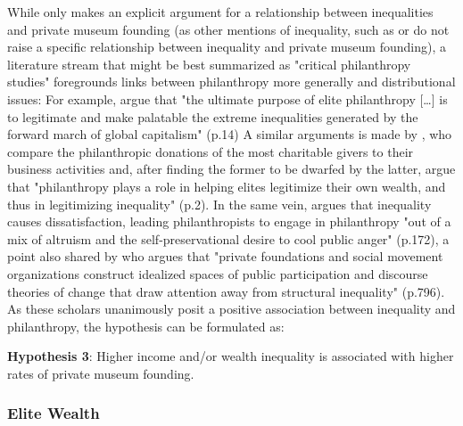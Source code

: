 \documentclass[11pt]{article}
\begin{document}
While only \textcite{Brown_2019_private}  makes an explicit argument for a relationship between inequalities and private museum founding (as other mentions of inequality, such as \textcite{KalbCosmo_2020_museum} or \textcite{Adam_2021_rise} do not raise a specific relationship between inequality and private museum founding), a literature stream that might be best summarized as "critical philanthropy studies" foregrounds links between philanthropy more generally and distributional issues:
For example, \textcite{Maclean_etal_2021_philanthropy} argue that "the ultimate purpose of elite philanthropy [\ldots{}] is to legitimate and make palatable the extreme inequalities generated by the forward march of global capitalism" (p.14)
A similar arguments is made by \textcite{Glucksberg_RussellPrywata_2020_philanthropy}, who compare the philanthropic donations of the most charitable givers to their business activities and, after finding the former to be dwarfed by the latter, argue that "philanthropy plays a role in helping elites legitimize their own wealth, and thus in legitimizing inequality" (p.2).
In the same vein, \textcite{Giridharadas_2018_winners} argues that inequality causes dissatisfaction, leading philanthropists to engage in philanthropy "out of a mix of altruism and the self-preservational desire to cool public anger" (p.172), a point also shared by \textcite{KohlArenas_2015_selfhelp} who argues that "private foundations and social movement organizations construct idealized spaces of public participation and discourse theories of change that draw attention away from structural inequality" (p.796). 
As these scholars unanimously posit a positive association between inequality and philanthropy, the hypothesis can be formulated as: 

\bigbreak
\noindent
\textbf{Hypothesis 3}: Higher income and/or wealth inequality is associated with higher rates of private museum founding.



\subsubsection*{Elite Wealth}
\end{document}
